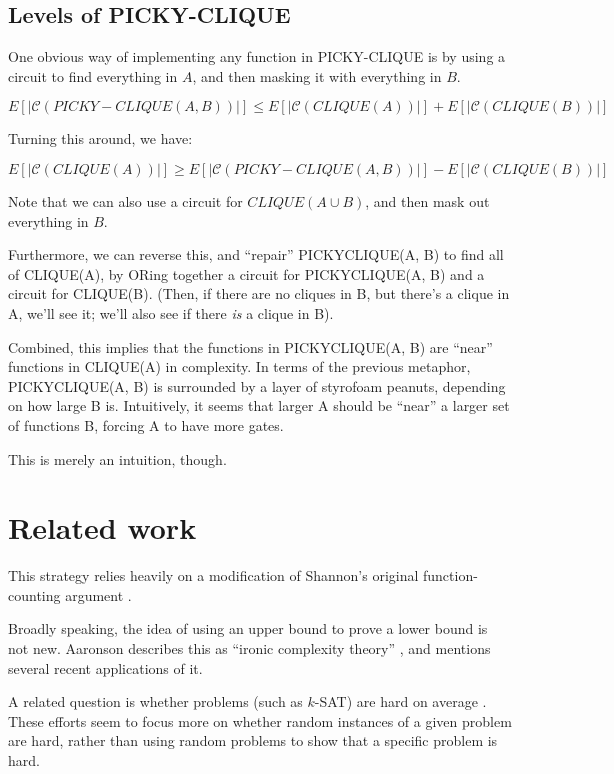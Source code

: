\documentclass[12pt]{article}
\theoremstyle{definition}
\newcommand{\bigC}[0]{\mathcal{C}}
\begin{document}
\subsection{Levels of PICKY-CLIQUE}

One obvious way of implementing any function in PICKY-CLIQUE
is by using a circuit to find everything in $A$, and then
masking it with everything in $B$.

\[
E[|\bigC(PICKY-CLIQUE(A, B))|] \le
E[|\bigC(CLIQUE(A))|] + E[|\bigC(CLIQUE(B))|]
\]

Turning this around, we have:

\[
E[|\bigC(CLIQUE(A))|]
\ge
E[|\bigC(PICKY-CLIQUE(A, B))|] - E[|\bigC(CLIQUE(B))|]
\]

Note that we can also use a circuit for $CLIQUE(A \cup B)$,
and then mask out everything in $B$.

Furthermore, we can reverse this, and ``repair'' 
PICKYCLIQUE(A, B) to find all of CLIQUE(A), by ORing together
a circuit for PICKYCLIQUE(A, B) and a circuit for CLIQUE(B).
(Then, if there are no cliques in B, but there's a clique in A,
we'll see it; we'll also see if there {\em is} a clique in B).

Combined, this implies that the functions in
PICKYCLIQUE(A, B) are ``near'' functions in CLIQUE(A) in
complexity. In terms of the previous metaphor, PICKYCLIQUE(A, B)
is surrounded by a layer of styrofoam peanuts, depending on how
large B is. Intuitively, it seems that larger A should be
``near'' a larger set of functions B, forcing A to have more
gates.

This is merely an intuition, though.


\section{Related work}

This strategy relies heavily on a modification of Shannon's original
function-counting argument \cite{shannon_synthesis_1949}.

Broadly speaking, the idea of using an upper bound to prove a lower bound
is not new. Aaronson describes this as ``ironic complexity theory''
\cite{aaronson_pnp}, and mentions several recent applications of it.

A related question is whether problems
(such as $k$-SAT) are
hard on average \cite{bogdanov2006average}.
These efforts seem to focus more on whether
random
instances of a given problem are hard, rather
than using random problems to show that
a specific problem is hard.
\end{document}
